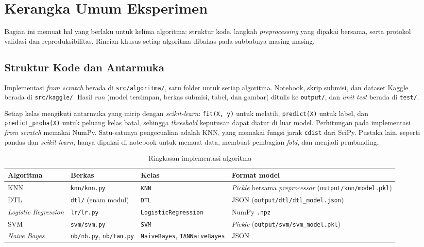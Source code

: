 \section{Kerangka Umum Eksperimen}
\label{sec:kerangka-umum}

Bagian ini memuat hal yang berlaku untuk kelima algoritma: struktur kode, langkah \textit{preprocessing}
yang dipakai bersama, serta protokol validasi dan reproduksibilitas. Rincian khusus setiap algoritma
dibahas pada subbabnya masing-masing.

\subsection{Struktur Kode dan Antarmuka}

Implementasi \textit{from scratch} berada di \nolinkurl{src/algoritma/}, satu folder untuk setiap
algoritma. Notebook, skrip submisi, dan dataset Kaggle berada di \nolinkurl{src/kaggle/}. Hasil
\textit{run} (model tersimpan, berkas submisi, tabel, dan gambar) ditulis ke \nolinkurl{output/}, dan
\textit{unit test} berada di \nolinkurl{test/}.

Setiap kelas mengikuti antarmuka yang mirip dengan \textit{scikit-learn}: \texttt{fit(X, y)} untuk
melatih, \texttt{predict(X)} untuk label, dan \texttt{predict\_proba(X)} untuk peluang kelas batal,
sehingga \textit{threshold} keputusan dapat diatur di luar model. Perhitungan pada implementasi
\textit{from scratch} memakai NumPy. Satu-satunya pengecualian adalah KNN, yang memakai fungsi jarak
\texttt{cdist} dari SciPy. Pustaka lain, seperti pandas dan \textit{scikit-learn}, hanya dipakai di
notebook untuk memuat data, membuat pembagian \textit{fold}, dan menjadi pembanding.

\begin{table}[H]
	\centering
	\caption{Ringkasan implementasi algoritma}
	\label{tab:ringkasan-implementasi}
	\begin{tabularx}{\textwidth}{l l l Y}
		\toprule
		\textbf{Algoritma} & \textbf{Berkas} & \textbf{Kelas} & \textbf{Format model} \\
		\midrule
		KNN & \nolinkurl{knn/knn.py} & \texttt{KNN} & \textit{Pickle} bersama \textit{preprocessor} (\nolinkurl{output/knn/model.pkl}) \\
		DTL & \nolinkurl{dtl/} (enam modul) & \texttt{DTL} & JSON (\nolinkurl{output/dtl/dtl_model.json}) \\
		\textit{Logistic Regression} & \nolinkurl{lr/lr.py} & \texttt{LogisticRegression} & NumPy \texttt{.npz} \\
		SVM & \nolinkurl{svm/svm.py} & \texttt{SVM} & \textit{Pickle} (\nolinkurl{output/svm/svm_model.pkl}) \\
		\textit{Naive Bayes} & \nolinkurl{nb/nb.py}, \nolinkurl{nb/tan.py} & \texttt{NaiveBayes}, \texttt{TANNaiveBayes} & JSON \\
		\bottomrule
	\end{tabularx}
\end{table}

